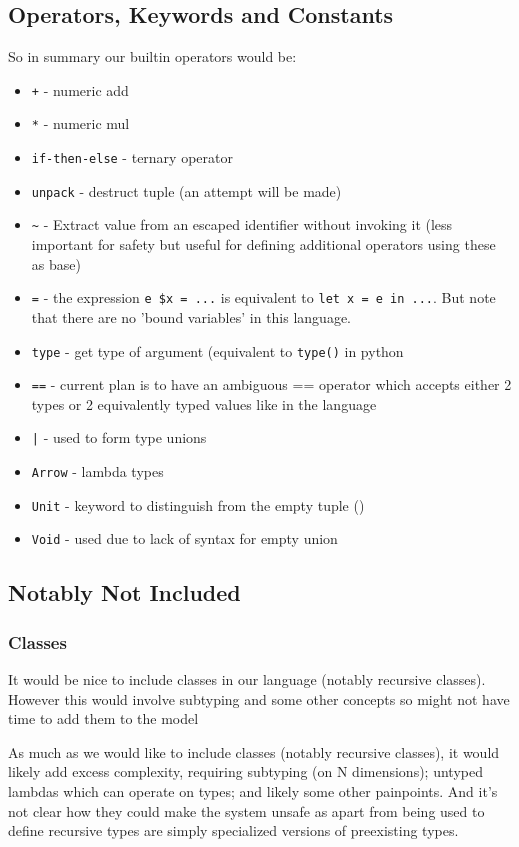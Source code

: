 \documentclass{article}
\begin{document}
\subsection{Operators, Keywords and Constants}
So in summary our builtin operators would be: 
\begin{itemize}
    \item \texttt{+} - numeric add
    \item \texttt{*} - numeric mul
    \item \texttt{if-then-else} - ternary operator
    \item \texttt{unpack} - destruct tuple (an attempt will be made)
    \item \texttt{\~} - Extract value from an escaped identifier without invoking it (less important for safety but useful for defining additional operators using these as base)
    \item \texttt{=} - the expression \texttt{e \$x = ...} is equivalent to \texttt{let x = e in ...}. But note that there are no 'bound variables' in this language.
    \item \texttt{type} - get type of argument (equivalent to \texttt{type()} in python
    \item \texttt{==} - current plan is to have an ambiguous == operator which accepts either 2 types or 2 equivalently typed values like in the language
    \item \texttt{|} - used to form type unions
    \item \texttt{Arrow} - lambda types
    \item \texttt{Unit} - keyword to distinguish from the empty tuple ()
    \item \texttt{Void} - used due to lack of syntax for empty union
\end{itemize}

\subsection{Notably Not Included}

\subsubsection{Classes}
It would be nice to include classes in our language (notably recursive classes). However this would involve subtyping and some other concepts so might not have time to add them to the model

As much as we would like to include classes (notably recursive classes), it would likely add excess complexity, requiring subtyping (on N dimensions); untyped lambdas which can operate on types; and likely some other painpoints. And it's not clear how they could make the system unsafe as apart from being used to define recursive types are simply specialized versions of preexisting types.
\end{document}
